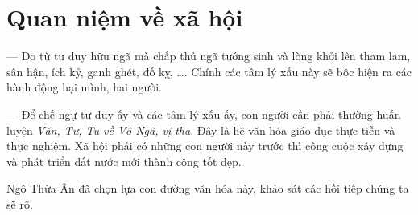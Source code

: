 \section{Quan niệm về xã hội} %
\label{sec:23_xa_hoi}

— Do từ tư duy hữu ngã mà chấp thủ ngã tướng sinh và lòng khởi lên tham lam, sân hận, ích kỷ, ganh ghét, đố kỵ, \ldots. Chính các tâm lý xấu này sẽ bộc hiện ra các hành động hại mình, hại người.

— Để chế ngự tư duy ấy và các tâm lý xấu ấy, con người cần phải thường huấn luyện \emph{Văn, Tư, Tu về Vô Ngã, vị tha}. Đây là hệ văn hóa giáo dục thực tiễn và thực nghiệm. Xã hội phải có những con người này trước thì công cuộc xây dựng và phát triển đất nước mới thành công tốt đẹp.

Ngô Thừa Ân đã chọn lựa con đường văn hóa này, khảo sát các hồi tiếp chúng ta sẽ rõ.

